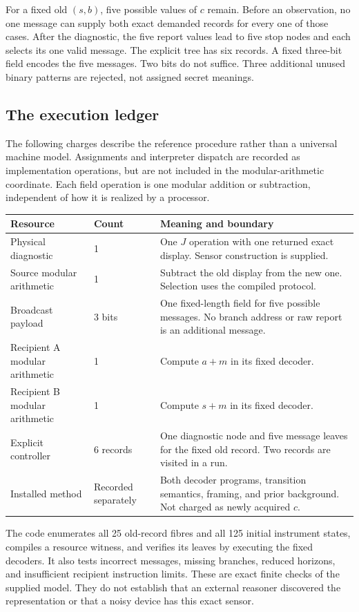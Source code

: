 For a fixed old $(s,b)$, five possible values of $c$ remain. Before an observation, no one message can supply both exact demanded records for every one of those cases. After the diagnostic, the five report values lead to five stop nodes and each selects its one valid message. The explicit tree has six records. A fixed three-bit field encodes the five messages. Two bits do not suffice. Three additional unused binary patterns are rejected, not assigned secret meanings.

\subsection{The execution ledger}
The following charges describe the reference procedure rather than a universal machine model. Assignments and interpreter dispatch are recorded as implementation operations, but are not included in the modular-arithmetic coordinate. Each field operation is one modular addition or subtraction, independent of how it is realized by a processor.

\begin{center}\small
\begin{tabularx}{\textwidth}{@{}P{1.7in}P{.7in}X@{}}\toprule
Resource & Count & Meaning and boundary\\\midrule
Physical diagnostic & 1 & One $J$ operation with one returned exact display. Sensor construction is supplied.\\
Source modular arithmetic & 1 & Subtract the old display from the new one. Selection uses the compiled protocol.\\
Broadcast payload & 3 bits & One fixed-length field for five possible messages. No branch address or raw report is an additional message.\\
Recipient A modular arithmetic & 1 & Compute $a+m$ in its fixed decoder.\\
Recipient B modular arithmetic & 1 & Compute $s+m$ in its fixed decoder.\\
Explicit controller & 6 records & One diagnostic node and five message leaves for the fixed old record. Two records are visited in a run.\\
Installed method & Recorded separately & Both decoder programs, transition semantics, framing, and prior background. Not charged as newly acquired $c$.\\\bottomrule
\end{tabularx}\end{center}

The code enumerates all 25 old-record fibres and all 125 initial instrument states, compiles a resource witness, and verifies its leaves by executing the fixed decoders. It also tests incorrect messages, missing branches, reduced horizons, and insufficient recipient instruction limits. These are exact finite checks of the supplied model. They do not establish that an external reasoner discovered the representation or that a noisy device has this exact sensor.


